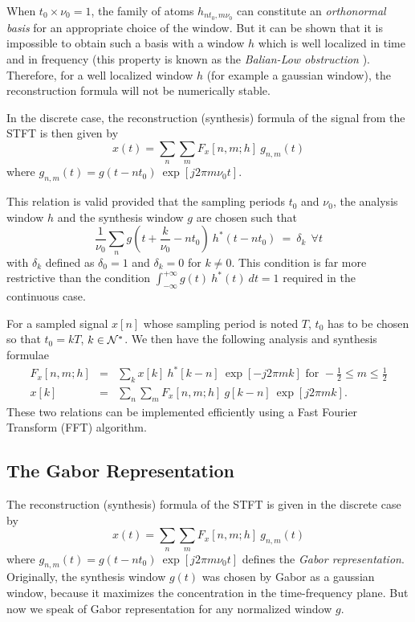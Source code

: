   When $t_0\times \nu_0 = 1$, the family of atoms ${h_{nt_0,m\nu_0}}$ can
constitute an {\it orthonormal basis} for an appropriate choice of the
window. But it can be shown that it is impossible to obtain such a basis
with a window $h$ which is well localized in time and in frequency (this
property is known as the {\it Balian-Low obstruction}
\cite{DAU92}). Therefore, for a well localized
window $h$ (for example a gaussian window), the reconstruction formula will
not be numerically stable.

  In the discrete case, the reconstruction (synthesis) formula of the
signal from the STFT is then given by
\[x(t) = \sum_n \sum_m F_x[n,m;h]\ g_{n,m}(t)\]
where $g_{n,m}(t)=g(t-nt_0)\ \exp{[j2\pi m \nu_0 t]}$.

This relation is valid provided that the sampling periods $t_0$ and
$\nu_0$, the analysis window $h$ and the synthesis window $g$ are chosen
such that
\[\frac{1}{\nu_0} \sum_n g(t+\frac{k}{\nu_0}-nt_0)\ h^*(t-nt_0)\ =\
\delta_k\ \ \forall t\]
with $\delta_k$ defined as $\delta_0=1$ and $\delta_k=0$ for $k\neq
0$. This condition is far more restrictive than the condition
$\int_{-\infty}^{+\infty} g(t)\ h^*(t)\ dt=1$ required in the continuous case.

  For a sampled signal $x[n]$ whose sampling period is noted $T$, $t_0$ has
to be chosen so that $t_0 = kT$, $k\in {\cal N}^*$. We then have the
following analysis and synthesis formulae
\begin{eqnarray}
\label{gabcoef}
F_x[n,m;h] &=& \sum_k x[k]\ h^*[k-n]\ \exp{[-j2\pi m k]} \mbox{   for   }
-\frac{1}{2} \leq  m \leq  \frac{1}{2} \\
\label{gabsynth}
      x[k] &=& \sum_n \sum_m F_x[n,m;h]\ g[k-n]\ \exp{[j2\pi m k]}.
\end{eqnarray}
These two relations can be implemented efficiently using a Fast Fourier
Transform (FFT) algorithm.


\subsection{The Gabor Representation}
  The reconstruction (synthesis) formula of the STFT is given in the discrete
case by
\[x(t) = \sum_n \sum_m F_x[n,m;h]\ g_{n,m}(t)\]
where $g_{n,m}(t)=g(t-nt_0)\ \exp{[j2\pi m \nu_0 t]}$ defines the {\it
Gabor representation}. \index{Gabor representation}Originally, the
synthesis window $g(t)$ was chosen by Gabor as a gaussian window, because
it maximizes the concentration in the time-frequency plane. But now we
speak of Gabor representation for any normalized window $g$.

